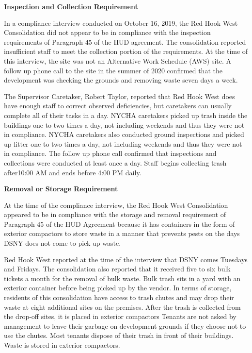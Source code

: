 

\textbf{Inspection and Collection Requirement}

In a compliance interview conducted on October 16, 2019, the Red Hook West Consolidation did not appear to be in compliance with the inspection requirements of Paragraph 45 of the HUD agreement. The consolidation reported insufficient staff to meet the collection portion of the requirements. At the time of this interview, the site was not an Alternative Work Schedule (AWS) site. A follow up phone call to the site in the summer of 2020 confirmed that the development was checking the grounds and removing waste seven days a week.

The Supervisor Caretaker, Robert Taylor, reported that Red Hook West does have enough staff to correct observed deficiencies, but caretakers can usually complete all of their tasks in a day. NYCHA caretakers picked up trash inside the buildings one to two times a day, not including weekends and thus they were not in compliance. NYCHA caretakers also conducted ground inspections and picked up litter one to two times a day, not including weekends and thus they were not in compliance. The follow up phone call confirmed that inspections and collections were conducted at least once a day. Staff begins collecting trash after10:00 AM and ends before 4:00 PM daily. 

\textbf{Removal or Storage Requirement}

At the time of the compliance interview, the Red Hook West Consolidation appeared to be in compliance with the storage and removal requirement of Paragraph 45 of the HUD Agreement because it has containers in the form of exterior compactors to store waste in a manner that prevents pests on the days DSNY does not come to pick up waste. 

Red Hook West reported at the time of the interview that DSNY comes Tuesdays and Fridays. The consolidation also reported that it received five to six bulk tickets a month for the removal of bulk waste. Bulk trash sits in a yard with an exterior container before being picked up by the vendor. In terms of storage, residents of this consolidation have access to trash chutes and may drop their waste at eight additional sites on the premises. After the trash is collected from the drop-off sites, it is placed in exterior compactors Tenants are not asked by management  to leave their garbage on development grounds if they choose not to use the chutes. Most tenants dispose of their trash in front of their buildings. Waste is stored in exterior compactors. 

